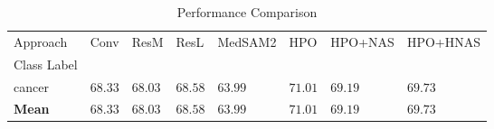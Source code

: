 \begin{table}
\caption{Performance Comparison}
\label{tab:results}
\begin{tabular}{llllllll}
\toprule
Approach & Conv & ResM & ResL & MedSAM2 & HPO & HPO+NAS & HPO+HNAS \\
Class Label &  &  &  &  &  &  &  \\
\midrule
cancer & $68.33$ & $68.03$ & $68.58$ & $63.99$ & $\mathbf{71.01}$ & $69.19$ & $69.73$ \\
\textbf{Mean} & $68.33$ & $68.03$ & $68.58$ & $63.99$ & $\mathbf{71.01}$ & $69.19$ & $69.73$ \\
\bottomrule
\end{tabular}
\end{table}
